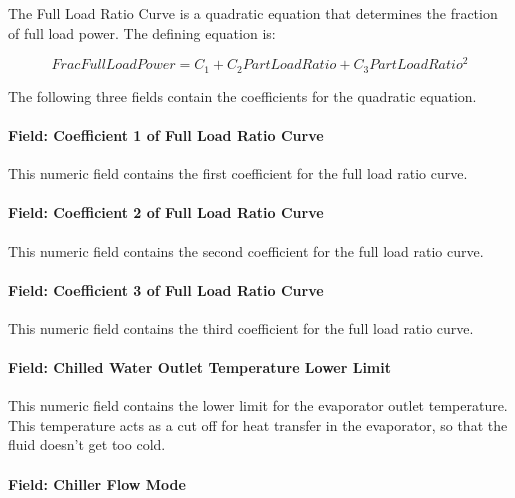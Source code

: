The Full Load Ratio Curve is a quadratic equation that determines the fraction of full load power. The defining equation is:

\begin{equation}
FracFullLoadPower = {C_1} + {C_2}PartLoadRatio + {C_3}PartLoadRati{o^2}
\end{equation}

The following three fields contain the coefficients for the quadratic equation.

\paragraph{Field: Coefficient 1 of Full Load Ratio Curve}\label{field-coefficient-1-of-full-load-ratio-curve}

This numeric field contains the first coefficient for the full load ratio curve.

\paragraph{Field: Coefficient 2 of Full Load Ratio Curve}\label{field-coefficient-2-of-full-load-ratio-curve}

This numeric field contains the second coefficient for the full load ratio curve.

\paragraph{Field: Coefficient 3 of Full Load Ratio Curve}\label{field-coefficient-3-of-full-load-ratio-curve}

This numeric field contains the third coefficient for the full load ratio curve.

\paragraph{Field: Chilled Water Outlet Temperature Lower Limit}\label{field-chilled-water-outlet-temperature-lower-limit-2}

This numeric field contains the lower limit for the evaporator outlet temperature. This temperature acts as a cut off for heat transfer in the evaporator, so that the fluid doesn't get too cold.

\paragraph{Field: Chiller Flow Mode}\label{field-chiller-flow-mode-3}

